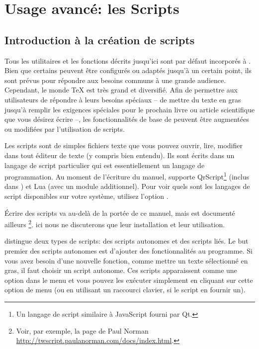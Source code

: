 
\chapter{Usage avanc{\'e}: les Scripts}

\section{Introduction à la création de scripts}

Tous les utilitaires et les fonctions décrits jusqu'ici sont par défaut incorporés à \Tw. Bien que certains peuvent être configurés ou adaptés jusqu'à un certain point, ils sont prévus pour répondre aux besoins communs à une grande audience. Cependant, le monde \TeX{} est très grand et diversifié. Afin de permettre aux utilisateurs de répondre à leurs besoins spéciaux -- de mettre du texte en gras jusqu'à remplir les exigences spéciales pour le prochain livre ou article scientifique que vous désirez écrire --, les fonctionnalités de base de \Tw{} peuvent être augmentées ou modifiées par l'utilisation de scripts.

Les scripts sont de simples fichiers texte que vous pouvez ouvrir, lire, modifier dans tout éditeur de texte (y compris \Tw{} bien entendu). Ils sont écrits dans un langage de script particulier qui est essentiellement un langage de programmation. Au moment de l'écriture du manuel, \Tw{} supporte QrScript\footnote{Un langage de script similaire à JavaScript fourni par Qt.} (inclus dans \Tw) et Lua (avec un module additionnel).%
Pour voir quels sont les langages de script disponibles sur votre système, utilisez l'option \submenu{}\submenu{}.

Écrire des scripts va au-delà de la portée de ce manuel, mais est documenté ailleurs \footnote{Voir, par exemple, la page de Paul Norman \url{http://twscript.paulanorman.com/docs/index.html}.}. ici nous ne discuterons que leur installation et leur utilisation.

\Tw{} distingue deux types de scripts: des scripts autonomes et des scripts liés. Le but premier des scripts autonomes est d'ajouter des fonctionnalités au programme. Si vous avez besoin d'une nouvelle fonction, comme mettre un texte sélectionné en gras, il faut choisir un script autonome. Ces scripts apparaissent comme une option dans le menu  et vous pouvez les exécuter simplement en cliquant sur cette option de menu (ou en utilisant un raccourci clavier, si le script en fournir un).

